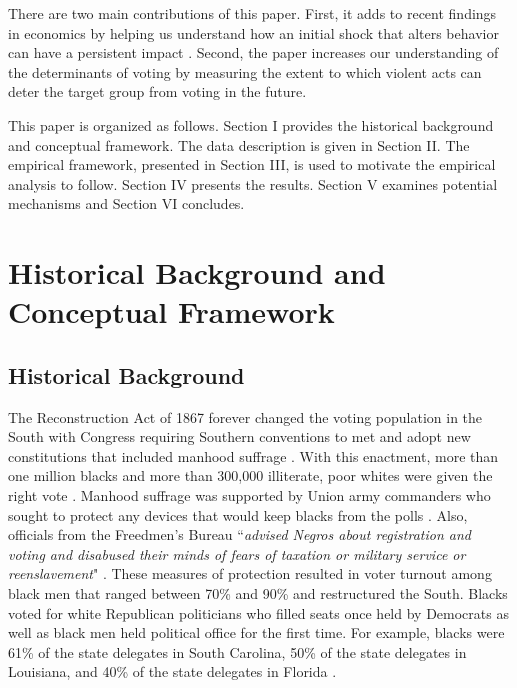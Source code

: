 \documentclass[AEJ, finalmode]{AEA}
\begin{document}
There are two main contributions of this paper. First, it adds to recent findings in economics by helping us understand how an initial shock that alters behavior can have a persistent impact \cite{nunn2011slave,acemoglu2012colonial,voigtlander2012persecution,acharya2016political}. Second, the paper increases our understanding of the determinants of voting by measuring the extent to which violent acts can deter the target group from voting in the future.

This paper is organized as follows. Section I provides the historical background and conceptual framework. The data description is given in Section II. The empirical framework, presented in Section III, is used to motivate the empirical analysis to follow. Section IV presents the results. Section V examines potential mechanisms and Section VI concludes.

\section{Historical Background and Conceptual Framework}
\subsection{Historical Background}

The Reconstruction Act of 1867 forever changed the voting population in the South with Congress requiring Southern conventions to met and adopt new constitutions that included manhood suffrage \cite{dubois1935black,foner1988reconstruction}. With this enactment, more than one million blacks and more than 300,000 illiterate, poor whites were given the right vote \cite{dubois1935black}. Manhood suffrage was supported by Union army commanders who sought to protect any devices that would keep blacks from the polls \cite{dubois1935black}. Also, officials from the Freedmen's Bureau ``\textit{advised Negros about registration and voting and disabused their minds of fears of taxation or military service or reenslavement}" \cite{dubois1935black}. These measures of protection resulted in voter turnout among black men that ranged between 70\% and 90\% \cite{kent2003making} and restructured the South. Blacks voted for white Republican politicians who filled seats once held by Democrats as well as black men held political office for the first time. For example, blacks were 61\% of the state delegates in South Carolina, 50\% of the state delegates in Louisiana, and 40\% of the state delegates in Florida \cite{dubois1935black}. 
\end{document}
